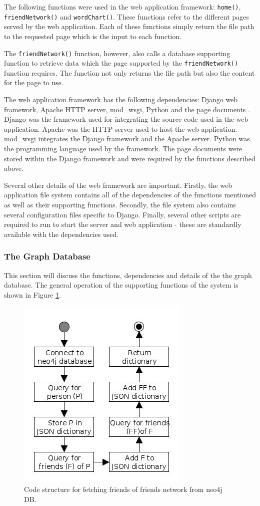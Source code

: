\documentclass[12pt,onecolumn]{article}
\begin{document}
	The following functions were used in the web application framework: \texttt{home()}, \texttt{friendNetwork()} and \texttt{wordChart()}. These functions refer to the different pages served by the web application. Each of these functions simply return the file path to the requested page which is the input to each function.
	
	The \texttt{friendNetwork()} function, however, also calls a database supporting function to retrieve data which the page supported by the \texttt{friendNetwork()} function requires. The function not only returns the file path but also the content for the page to use.
	
	The web application framework has the following dependencies: Django web framework, Apache HTTP server, mod\_wsgi, Python  and the page documents \cite{django, apache, wsgi}. Django was the framework used for integrating the source code used in the web application. Apache was the HTTP server used to host the web application. mod\_wsgi integrates the Django framework and the Apache server. Python was the programming language used by the framework. The page documents were stored within the Django framework and were required by the functions described above. 
	
	Several other details of the web framework are important. Firstly, the web application file system contains all of the dependencies of the functions mentioned as well as their supporting functions. Secondly, the file system also contains several configuration files specific to Django. Finally, several other scripts are required to run to start the server and web application - these are standardly available with the dependencies used.
	
	\subsubsection{The Graph Database}
	This section will discuss the functions, dependencies and details of the the graph database. The general operation of the supporting functions of the system is shown in Figure \ref{fig:db}.
	
	\begin{figure} [htb]
		\centering
		\includegraphics[scale=1]{neo4jdb}
		\caption{Code structure for fetching friends of friends network from neo4j DB.} \label{fig:db}
	\end{figure}
	
\end{document}
